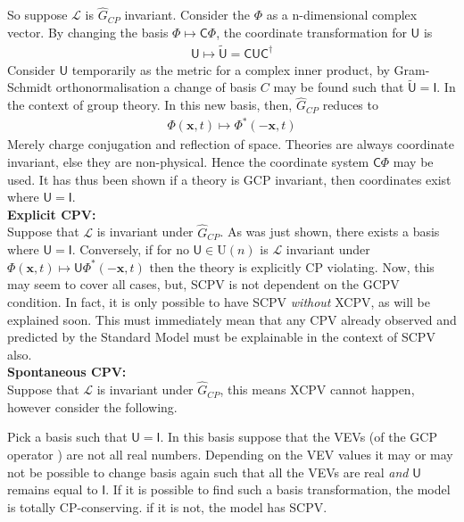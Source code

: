 So suppose $\mathcal{L}$ is $\hat{G}_{CP}$ invariant. Consider the $\Phi$ as a n-dimensional complex vector. By changing the basis $\Phi \mapsto \mathsf{C}\Phi$, the coordinate transformation for $\mathsf{U}$ is
\begin{align*}
\mathsf{U} \mapsto \tilde{\mathsf{U}}= \mathsf{CU}\mathsf{C}^\dagger
\end{align*}
Consider $\mathsf{U}$ temporarily as the metric for a complex inner product, by Gram-Schmidt orthonormalisation a change of basis $C$ may be found such that $\tilde{\mathsf{U}}=\mathsf{I}$. In the context of group theory. In this new basis, then, $\hat{G}_{CP}$ reduces to
\begin{align*}
\Phi(\mathbf{x},t) \mapsto \Phi^*(-\mathbf{x},t)
\end{align*}
Merely charge conjugation and reflection of space. Theories are always coordinate invariant, else they are non-physical. Hence the coordinate system $\mathsf{C}\Phi$ may be used. It has thus been shown if a theory is GCP invariant, then coordinates exist where $\mathsf{U}=\mathsf{I}$.\\

\textbf{Explicit CPV:}\\
Suppose that $\mathcal{L}$ is invariant under $\hat{G}_{CP}$. As was just shown, there exists a basis where $\mathsf{U}=\mathsf{I}$. Conversely, if for no $\mathsf{U}\in\mathrm{U}(n)$ is $\mathcal{L}$ invariant under $\Phi(\mathbf{x},t) \mapsto \mathsf{U}\Phi^*(-\mathbf{x},t)$ then the theory is explicitly CP violating. Now, this may seem to cover all cases, but, SCPV is not dependent on the GCPV condition. In fact, it is only possible to have SCPV \textit{without} XCPV, as will be explained soon. This must immediately mean that any CPV already observed and predicted by the Standard Model must be explainable in the context of SCPV also.\\

\textbf{Spontaneous CPV:}\\
Suppose that $\mathcal{L}$ is invariant under $\hat{G}_{CP}$, this means XCPV cannot happen, however consider the following.

Pick a basis such that $\mathsf{U}=\mathsf{I}$. In this basis suppose that the VEVs (of the GCP operator ) are not all real numbers. Depending on the VEV values it may or may not be possible to change basis again such that all the VEVs are real \textit{and} $\mathsf{U}$ remains equal to $\mathsf{I}$. If it is possible to find such a basis transformation, the model is totally CP-conserving. if it is not, the model has SCPV.

